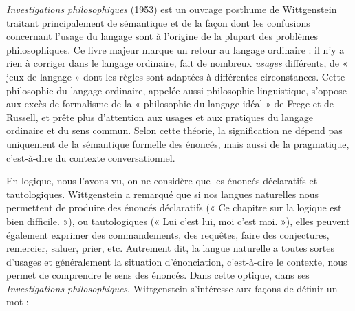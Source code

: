 \textit{Investigations philosophiques} (1953) est un ouvrage posthume de Wittgenstein traitant principalement de sémantique et de la façon dont les confusions concernant l’usage du langage sont à l’origine de la plupart des problèmes philosophiques. Ce livre majeur marque un retour au langage ordinaire : il n’y a rien à corriger dans le langage ordinaire, fait de nombreux \textit{usages} différents, de « jeux de langage » dont les règles sont adaptées à différentes circonstances. Cette philosophie du langage ordinaire, appelée aussi philosophie linguistique, s’oppose aux excès de formalisme de la « philosophie du langage idéal » de Frege et de Russell, et prête plus d’attention aux usages et aux pratiques du langage ordinaire et du sens commun. Selon cette théorie, la signification ne dépend pas uniquement de la sémantique formelle des énoncés, mais aussi de la pragmatique, c’est-à-dire du contexte conversationnel.

En logique, nous l’avons vu, on ne considère que les énoncés déclaratifs et tautologiques. Wittgenstein a remarqué que si nos langues naturelles nous permettent de produire des énoncés déclaratifs (« Ce chapitre sur la logique est bien difficile. »), ou tautologiques (« Lui c’est lui, moi c’est moi. »), elles peuvent également exprimer des commandements, des requêtes, faire des conjectures, remercier, saluer, prier, etc. Autrement dit, la langue naturelle a toutes sortes d’usages et généralement la situation d’énonciation, c’est-à-dire le contexte, nous permet de comprendre le sens des énoncés. Dans cette optique, dans ses \textit{Investigations philosophiques}, Wittgenstein s’intéresse aux façons de définir un mot :

